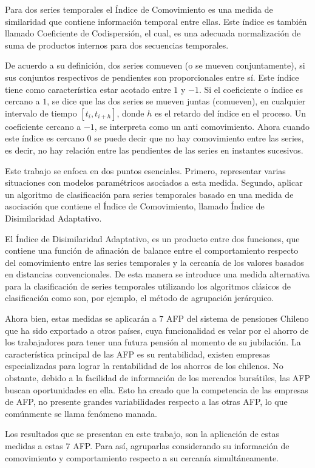 
\def\baselinestretch{1.0}
Para dos series temporales el \'Indice de Comovimiento es una medida de similaridad que contiene informaci\'on temporal entre ellas. Este \'indice es tambi\'en llamado Coeficiente de Codispersi\'on, el cual, es una adecuada normalizaci\'on de suma de productos internos para dos secuencias temporales.

De acuerdo a su definici\'on, dos series comueven (o se mueven conjuntamente), si sus conjuntos respectivos de pendientes son proporcionales entre s\'i. Este \'indice tiene como caracter\'istica estar acotado entre $1$ y $-1$. Si el coeficiente o \'indice es cercano a $1$, se dice que las dos series se mueven juntas (comueven), en cualquier intervalo de tiempo $[t_{i} ,t_{i+h}]$, donde $h$ es el retardo del \'indice en el proceso. Un coeficiente cercano a $-1$, se interpreta como un anti comovimiento. Ahora cuando este \'indice es cercano $0$ se puede decir que no hay comovimiento entre las series, es decir, no hay relaci\'on entre las pendientes de las series en instantes sucesivos.

Este trabajo se enfoca en dos puntos e\-sen\-cia\-les. Primero, representar varias situaciones con modelos param\'etricos asociados a esta medida. Segundo, aplicar un algoritmo de clasificaci\'on para series temporales basado en una medida de asociaci\'on que contiene el \'Indice de Comovimiento, llamado \'Indice de Disimilaridad Adaptativo.

El \'Indice de Disimilaridad Adaptativo, es un producto entre dos funciones, que contiene una funci\'on de afinaci\'on de balance entre el comportamiento respecto del comovimiento entre las series temporales y la cercan\'ia de los valores basados en distancias convencionales. De esta manera se introduce una medida alternativa para la clasificaci\'on de series temporales utilizando los algoritmos cl\'asicos de clasificaci\'on como son, por ejemplo, el m\'etodo de agrupaci\'on jer\'arquico.

Ahora bien, estas medidas se aplicar\'an a $7$ AFP del sistema de pensiones Chileno que ha sido exportado a otros pa\'ises, cuya funcionalidad es velar por el ahorro de los trabajadores para tener una futura pensi\'on al momento de su jubilaci\'on. La caracter\'istica principal de las AFP es su rentabilidad, existen empresas especializadas para lograr la rentabilidad de los ahorros de los chilenos. No obstante, debido a la facilidad de informaci\'on de los mercados burs\'atiles, las AFP buscan oportunidades en ella. Esto ha creado que la competencia de las empresas de AFP, no presente grandes variabilidades respecto a las otras AFP, lo que com\'unmente se llama fen\'omeno manada.

Los resultados que se presentan en este trabajo, son la aplicaci\'on de estas medidas a estas $7$ AFP. Para as\'i, agruparlas considerando su informaci\'on de comovimiento y comportamiento respecto a su cercan\'ia simult\'aneamente.
